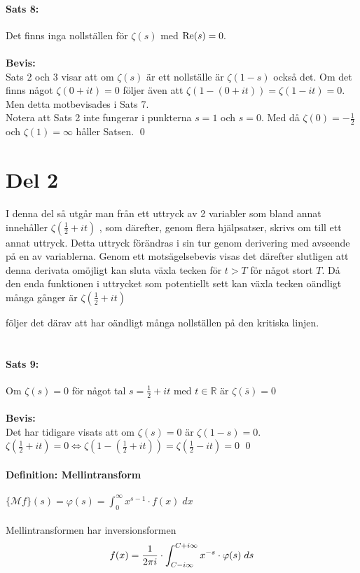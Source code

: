 \documentclass[a4paper]{article}%
\begin{document}
\paragraph{Sats 8:} Det finns inga nollställen för $\zeta(s)$ med $\operatorname{Re}(s) = 0.$\\
\\
{\bf Bevis:}\\
Sats 2 och 3 visar att om $\zeta(s)$ är ett nollställe är $\zeta(1 - s)$ också det.
Om det finns något $\zeta(0 + it) = 0$ följer även att $\zeta(1 - (0 + it)) = \zeta(1 - it) = 0$. Men detta 
motbevisades i Sats 7.\\
Notera att Sats 2 inte fungerar i punkterna $s = 1$ och $s = 0$. Med då $\zeta(0) = -\frac 1 2$ och 
$\zeta(1) = \infty$ håller Satsen.
\hfill \qed
\pagebreak
\newcommand{\zit}{
	$\zeta(\frac 1 2 + it)$
}
\section*{Del 2}
I denna del så utgår man från ett uttryck av 2 variabler som bland annat innehåller \zit, som
därefter, genom flera hjälpsatser, skrivs om till ett annat uttryck. Detta uttryck förändras i sin tur
genom derivering med avseende på en av variablerna. Genom ett motsägelsebevis visas det därefter
slutligen att denna derivata omöjligt kan sluta växla tecken för $t > T$ för något stort $T$. Då den enda
funktionen i uttrycket som potentiellt sett kan växla tecken oändligt många gånger är \zit 
följer det därav att \zfn har oändligt många nollställen på den kritiska linjen.\\
\\
\paragraph{Sats 9:} Om $\zeta(s) = 0$ för något tal $s = \frac 1 2 + it$ med $t \in \mathbb{R}$ är $\zeta(\overline{s}) = 0$ \\
\\
{\bf Bevis:}\\
Det har tidigare visats att om $\zeta(s) = 0$ är $\zeta(1 - s) = 0$. $\zeta(\frac 1 2 + it) = 0 \Leftrightarrow 
\zeta(1 - (\frac 1 2 + it)) = \zeta(\frac 1 2 - it) = 0$
\hfill \qed

\paragraph{Definition: Mellintransform} $\{\mathcal{M}f\}(s) = \varphi(s) = \int_0^\infty x^{s - 1} \cdot f(x) \; dx $ \\
\\
Mellintransformen har inversionsformen
\[
	f(x) = \frac {1} {2 \pi i} \cdot \int_{C - i \infty}^{C + i \infty}
		x^{-s} \cdot \varphi(s) \; ds
 \]
\end{document}
